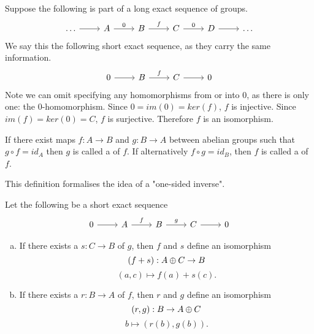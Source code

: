 \begin{example}
Suppose the following is part of a long exact sequence of groups.
\[\begin{tikzcd}
\dots \arrow[r] & A \arrow[r, "0"] & B \arrow[r, "f"] & C \arrow[r, "0"] & D \arrow[r] & \dots
\end{tikzcd}\]
We say this  the following short exact sequence, as they carry the same information.
\[\begin{tikzcd}
0 \arrow[r] & B \arrow[r, "f"] & C \arrow[r] & 0
\end{tikzcd}\]
Note we can omit specifying any homomorphisms from or into $0$, as there is only one: the $0$-homomorphism. Since $0=im(0)=ker(f)$, $f$ is injective. Since $im(f)=ker(0)=C$, $f$ is surjective. Therefore $f$ is an isomorphism.
\end{example}

\begin{definition}
If there exist maps $f:A\rightarrow B$ and $g:B\rightarrow A$ between abelian groups such that $g\circ f = id_A$ then $g$ is called a  of $f$. If alternatively $f\circ g=id_B$, then $f$ is called a  of $f$.
\end{definition}
This definition formalises the idea of a "one-sided inverse".

\begin{prop}\label{short-seq-direct-sum}
Let the following be a short exact sequence
\[\begin{tikzcd}
0 \arrow[r] & A \arrow[r, "f"] & B \arrow[r, "g"] & C \arrow[r] & 0
\end{tikzcd}\]
\begin{enumerate}[(a)]
    \item If there exists a  $s:C\rightarrow B$ of $g$, then $f$ and $s$ define an isomorphism $$(f+s):A\oplus C\rightarrow B$$
$$(a,c)\mapsto f(a)+s(c).$$
\item If there exists a  $r:B\rightarrow A$ of $f$, then $r$ and $g$ define an isomorphism $$(r,g):B\rightarrow A\oplus C$$
$$b\mapsto (r(b),g(b)).$$
\end{enumerate}
\end{prop}

